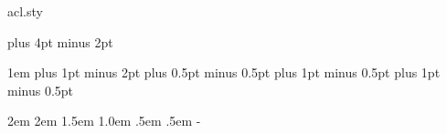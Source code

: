 \begin{filecontents*}[overwrite]{acl.sty}
\def\section{\@startsection {section}{1}{\z@}{-2.0ex plus
    -0.5ex minus -.2ex}{1.5ex plus 0.3ex minus .2ex}{\large\bfseries\raggedright}}
\def\subsection{\@startsection{subsection}{2}{\z@}{-1.8ex plus
    -0.5ex minus -.2ex}{0.8ex plus .2ex}{\normalsize\bfseries\raggedright}}
\def\subsubsection{\@startsection{subsubsection}{3}{\z@}{-1.5ex plus
   -0.5ex minus -.2ex}{0.5ex plus .2ex}{\normalsize\bfseries\raggedright}}
\def\paragraph{\@startsection{paragraph}{4}{\z@}{1.5ex plus
   0.5ex minus .2ex}{-1em}{\normalsize\bfseries}}
\def\subparagraph{\@startsection{subparagraph}{5}{\parindent}{1.5ex plus
   0.5ex minus .2ex}{-1em}{\normalsize\bfseries}}

\footnotesep 6.65pt %
\skip\footins 9pt plus 4pt minus 2pt
\def\footnoterule{\kern-3pt \hrule width 5pc \kern 2.6pt }
\setcounter{footnote}{0}

\parindent 1em
\topsep 4pt plus 1pt minus 2pt
\partopsep 1pt plus 0.5pt minus 0.5pt
\itemsep 2pt plus 1pt minus 0.5pt
\parsep 2pt plus 1pt minus 0.5pt

\leftmargin 2em \leftmargini\leftmargin \leftmarginii 2em
\leftmarginiii 1.5em \leftmarginiv 1.0em \leftmarginv .5em \leftmarginvi .5em
\leftmargini\advance{}- {}

\def\@listi{\leftmargin\leftmargini}
\def\@listii{\leftmargin\leftmarginii
   \labelwidth\leftmarginii\advance\labelwidth-\labelsep
   \topsep 2pt plus 1pt minus 0.5pt
   \parsep 1pt plus 0.5pt minus 0.5pt
   \itemsep \parsep}
\def\@listiii{\leftmargin\leftmarginiii
    \labelwidth\leftmarginiii\advance\labelwidth-\labelsep
    \topsep 1pt plus 0.5pt minus 0.5pt
    \parsep \z@ \partopsep 0.5pt plus 0pt minus 0.5pt
    \itemsep \topsep}
\def\@listiv{\leftmargin\leftmarginiv
     \labelwidth\leftmarginiv\advance\labelwidth-\labelsep}
\def\@listv{\leftmargin\leftmarginv
     \labelwidth\leftmarginv\advance\labelwidth-\labelsep}
\def\@listvi{\leftmargin\leftmarginvi
     \labelwidth\leftmarginvi\advance\labelwidth-\labelsep}


\end{filecontents*}
